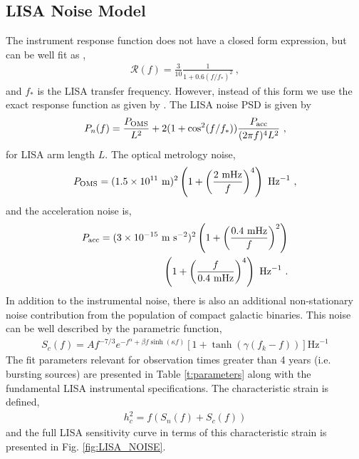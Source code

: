 \documentclass[a4paper,fleqn,usenatbib]{mnras}
\begin{document}
\subsection{LISA Noise Model}
\label{sec:LISAnoise}
The instrument response function does not have a closed form expression, but can be well fit as \citep{Robson2019},
\begin{eqnarray}
\mathcal{R}(f) = \frac{3}{10} \frac{1}{1+0.6(f/f_*)^2} \ ,
\end{eqnarray}
and $f_*$ is the LISA transfer frequency. However, instead of this form we use the exact response function as given by \cite{RobsonGIT2018}. The LISA noise PSD is given by
\begin{eqnarray}
P_n(f) = \frac{P_{\rm OMS}}{L^2} + 2(1+\cos^2(f/f_*)) \frac{P_{\rm acc}}{(2\pi f)^4 L^2} \ ,
\end{eqnarray}
for LISA arm length $L $. The  optical metrology noise,
\begin{eqnarray}
P_{\rm OMS} = (1.5 \times 10^{11} \text{ m})^2 \left(1 + \left(\frac{2 \text{ mHz}}{f}\right)^4\right) \text{ Hz}^{-1} \ ,
\end{eqnarray}
and the acceleration noise is,
\begin{align}
P_{\rm acc} = (3 \times 10^{-15} \text{ m s}^{-2})^2 \left(1 + \left(\frac{0.4 \text{ mHz}}{f}\right)^2\right) \nonumber \\ 
\left(1 + \left(\frac{f}{0.4 \text{ mHz}}\right)^4\right) \text{ Hz}^{-1} \ .
\end{align}
In addition to the instrumental noise, there is also an additional non-stationary noise contribution from the population of compact galactic binaries. This noise can be well described by the parametric function,
\begin{align}
S_c(f) = A f^{-7/3} e^{-f^{\alpha} + \beta f \sinh(\kappa f)} \left[ 1 + \tanh (\gamma (f_k - f))\right] \text{Hz} ^{-1}
\end{align}
The fit parameters relevant for observation times greater than 4 years (i.e. bursting sources)  are presented in Table \ref{t:parameters} along with the fundamental LISA instrumental specifications. The characteristic strain is defined,
\begin{eqnarray}
h_c^2 = f(S_n(f) + S_c(f)) 
\label{eq:strain}
\end{eqnarray}
and the full LISA sensitivity curve in terms of this characteristic strain is presented in Fig. \ref{fig:LISA_NOISE}.
\end{document}

